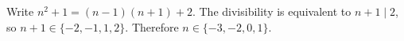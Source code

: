 Write $n^2+1=(n-1)(n+1)+2$. The divisibility is equivalent to $n+1\mid2$, so $n+1\in\{-2,-1,1,2\}$. Therefore $\boxed{n\in\{-3,-2,0,1\}}$.
